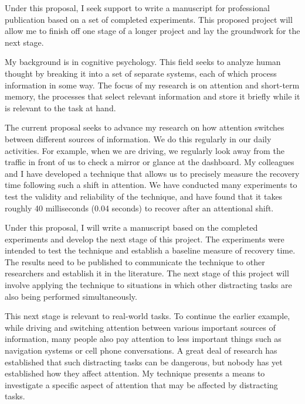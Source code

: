 \documentclass[12pt]{article}
\newcommand{\MySection}[2]{%
  \normalfont\normalsize\noindent{\bf#1.\hspace{1em}#2}}
\begin{document}
\MySection{A}{Summary Description}


Under this proposal, I seek support to write a manuscript for professional
publication based on a set of completed experiments.  This proposed project
will allow me to finish off one stage of a longer project and lay the
groundwork for the next stage.


My background is in cognitive psychology.  This field seeks to analyze
human thought by breaking it into a set of separate systems, each of which
process information in some way.  The focus of my research is on attention
and short-term memory, the processes that select relevant information and
store it briefly while it is relevant to the task at hand.


The current proposal seeks to advance my research on how attention switches
between different sources of information.  We do this regularly in our
daily activities.  For example, when we are driving, we regularly look away
from the traffic in front of us to check a mirror or glance at the
dashboard.  My colleagues and I have developed a technique that allows us
to precisely measure the recovery time following such a shift in attention.
We have conducted many experiments to test the validity and reliability of
the technique, and have found that it takes roughly 40 milliseconds (0.04
seconds) to recover after an attentional shift.


Under this proposal, I will write a manuscript based on the completed
experiments and develop the next stage of this project.  The experiments
were intended to test the technique and establish a baseline measure of
recovery time.  The results need to be published to communicate the
technique to other researchers and establish it in the literature. The next
stage of this project will involve applying the technique to situations in
which other distracting tasks are also being performed simultaneously.

This next stage is relevant to real-world tasks.  To continue the earlier
example, while driving and switching attention between various important
sources of information, many people also pay attention to less important
things such as navigation systems or cell phone conversations.  A great
deal of research has established that such distracting tasks can be
dangerous, but nobody has yet established how they affect attention.  My
technique presents a means to investigate a specific aspect of attention
that may be affected by distracting tasks.
\end{document}
